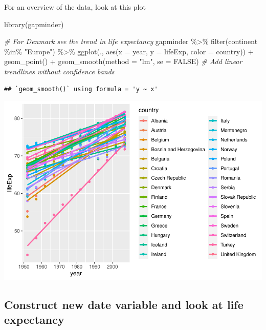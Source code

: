 \documentclass[
]{book}
\newenvironment{Shaded}{\begin{snugshade}}{\end{snugshade}}
\newcommand{\AttributeTok}[1]{\textcolor[rgb]{0.77,0.63,0.00}{#1}}
\newcommand{\CommentTok}[1]{\textcolor[rgb]{0.56,0.35,0.01}{\textit{#1}}}
\newcommand{\ConstantTok}[1]{\textcolor[rgb]{0.00,0.00,0.00}{#1}}
\newcommand{\FunctionTok}[1]{\textcolor[rgb]{0.00,0.00,0.00}{#1}}
\newcommand{\NormalTok}[1]{#1}
\newcommand{\SpecialCharTok}[1]{\textcolor[rgb]{0.00,0.00,0.00}{#1}}
\newcommand{\StringTok}[1]{\textcolor[rgb]{0.31,0.60,0.02}{#1}}
\begin{document}
For an overview of the data, look at this plot

\begin{Shaded}
\begin{Highlighting}[]
\FunctionTok{library}\NormalTok{(gapminder)}

\CommentTok{\# For Denmark see the trend in life expectancy}
\NormalTok{gapminder }\SpecialCharTok{\%\textgreater{}\%} \FunctionTok{filter}\NormalTok{(continent }\SpecialCharTok{\%in\%} \StringTok{"Europe"}\NormalTok{) }\SpecialCharTok{\%\textgreater{}\%} 
  \FunctionTok{ggplot}\NormalTok{(., }\FunctionTok{aes}\NormalTok{(}\AttributeTok{x =}\NormalTok{ year, }\AttributeTok{y =}\NormalTok{ lifeExp, }\AttributeTok{color =}\NormalTok{ country)) }\SpecialCharTok{+}
  \FunctionTok{geom\_point}\NormalTok{() }\SpecialCharTok{+}
  \FunctionTok{geom\_smooth}\NormalTok{(}\AttributeTok{method =} \StringTok{"lm"}\NormalTok{, }\AttributeTok{se =} \ConstantTok{FALSE}\NormalTok{)  }\CommentTok{\# Add linear trendlines without confidence bands}
\end{Highlighting}
\end{Shaded}

\begin{verbatim}
## `geom_smooth()` using formula = 'y ~ x'
\end{verbatim}

\includegraphics{data_files/figure-latex/unnamed-chunk-21-1.pdf}

\hypertarget{construct-new-date-variable-and-look-at-life-expectancy}{%
\subsection{Construct new date variable and look at life
expectancy}\label{construct-new-date-variable-and-look-at-life-expectancy}}
\end{document}
